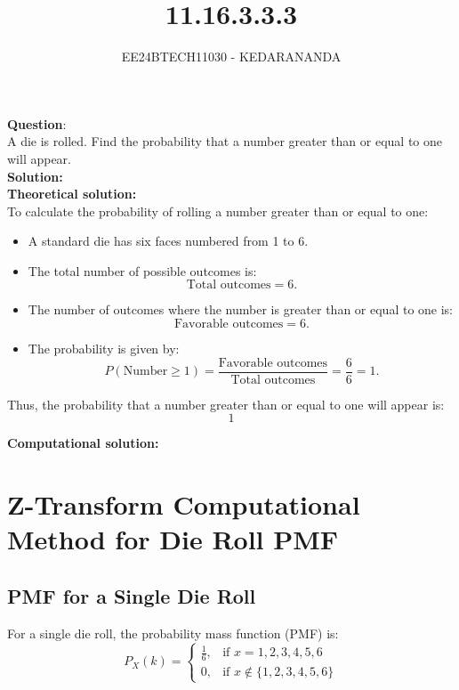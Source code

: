 \documentclass[journal]{IEEEtran}
\begin{document}
	
	
	\vspace{3cm}
	
	\title{11.16.3.3.3}
	\author{EE24BTECH11030 - KEDARANANDA }
	{\let\newpage\relax\maketitle}
	
	\renewcommand{\thefigure}{\theenumi}
	\renewcommand{\thetable}{\theenumi}
	\setlength{\intextsep}{10pt} %
	
	
	\renewcommand{\thetable}{\theenumi}
	
	
	\textbf{Question}:\\
	A die is rolled. Find the probability that a number greater than or equal to one will appear.\\
	\textbf{Solution: }\\
	\textbf{Theoretical solution: }\\
	To calculate the probability of rolling a number greater than or equal to one:
	
	\begin{itemize}
		\item A standard die has six faces numbered from 1 to 6.
		\item The total number of possible outcomes is:
		\[
		\text{Total outcomes} = 6.
		\]
		\item The number of outcomes where the number is greater than or equal to one is:
		\[
		\text{Favorable outcomes} = 6.
		\]
		\item The probability is given by:
		\[
		P(\text{Number} \geq 1) = \frac{\text{Favorable outcomes}}{\text{Total outcomes}} = \frac{6}{6} = 1.
		\]
	\end{itemize}
	
	Thus, the probability that a number greater than or equal to one will appear is:
	\[
	\boxed{1}
	\]
	
	\textbf{Computational solution: }\\
	\section*{Z-Transform Computational Method for Die Roll PMF}
	\subsection*{PMF for a Single Die Roll}
	For a single die roll, the probability mass function (PMF) is:
	\[
	P_X(k) =
	\begin{cases}
		\frac{1}{6}, & \text{if } x = 1, 2, 3, 4, 5, 6 \\
		0, & \text{if } x \notin \{1, 2, 3, 4, 5, 6\}
	\end{cases}
	\]
	
\end{document}
